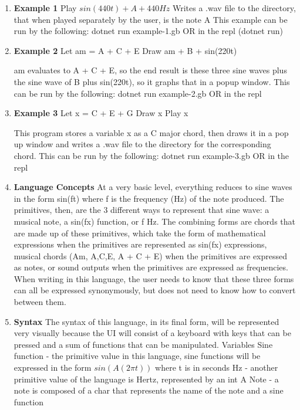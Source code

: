 \documentclass[12pt]{article}
\begin{document}
\begin{flushleft}
\begin{enumerate}
\item
\textbf{Example 1}
Play $sin(440t) + A + 440Hz$
Writes a .wav file to the directory, that when played separately by the user, is the note A
This example can be run by the following:
dotnet run example-1.gb
OR in the repl (dotnet run)
\item
\textbf{Example 2}
Let am = A + C + E
Draw am  + B + sin(220t)

am evaluates to A + C + E, so the end result is these three sine waves plus the sine wave of B plus sin(220t), so it graphs that in a popup window. This can be run by the following:
dotnet run example-2.gb
OR in the repl 
\item
\textbf{Example 3}
Let x = C + E + G
Draw x
Play x

This program stores a variable x as a C major chord, then draws it in a pop up window and writes a .wav file to the directory for the corresponding chord. This can be run by the following:
dotnet run example-3.gb
OR in the repl
\item
\textbf{Language Concepts}
At a very basic level, everything reduces to sine waves in the form sin(ft) where f is the frequency (Hz) of the note produced. The primitives, then, are the 3 different ways to represent that sine wave: a musical note, a sin(fx) function, or f Hz. The combining forms are chords that are made up of these primitives, which take the form of mathematical expressions when the primitives are represented as sin(fx) expressions, musical chords (Am, {A,C,E}, A + C + E) when the primitives are expressed as notes, or sound outputs when the primitives are expressed as frequencies. When writing in this language, the user needs to know that these three forms can all be expressed synonymously, but does not need to know how to convert between them.
\item
\textbf{Syntax}
The syntax of this language, in its final form, will be represented very visually because the UI will consist of a keyboard with keys that can be pressed and a sum of functions that can be manipulated.
\linebreak
Variables
\linebreak
Sine function - the primitive value in this language, sine functions will be expressed in the form $sin(A(2\pi t))$ where t is in seconds
\linebreak
Hz - another primitive value of the language is Hertz, represented by an int A 
\linebreak
Note - a note is composed of a char that represents the name of the note and a sine function

\end{enumerate}
\end{flushleft}
\end{document}
